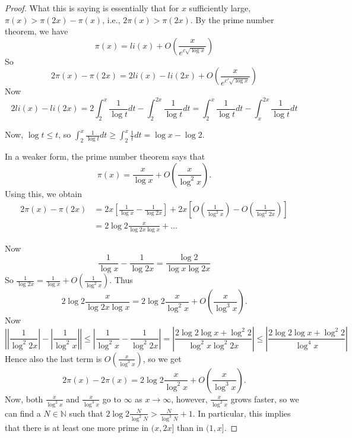\documentclass[reqno]{amsart}
\theoremstyle{definition}
\theoremstyle{remark}
\begin{document}
\begin{proof}
    What this is saying is essentially that
    for $x$ sufficiently large,
    $\pi(x) > \pi(2x) - \pi(x)$, i.e.,
    $2 \pi(x) > \pi(2x)$. By the prime number theorem, we
    have
    \[
    \pi(x) = li(x) + O\left( \frac{x}{e^{c \sqrt{\log x} }} \right) 
    \] 
    So
    \[
    2\pi(x) - \pi(2x)
    = 2 li(x) - li(2x)
    + O \left( \frac{x}{e^{c' \sqrt{\log x} }} \right) 
    \] 
    Now
    \[
    2 li(x) - li(2x)
    = 2 \int_{2}^{x} \frac{1}{\log t}dt
    - \int_{2}^{2x} \frac{1}{\log t}dt
    = \int_{2}^{x} \frac{1}{\log t}dt
    - \int_{x}^{2x} \frac{1}{\log t} dt 
    \] 

    Now,
    $\log t \le t$, so
    $\int_{2}^{x} \frac{1}{\log t} dt
    \ge \int_{2}^{x} \frac{1}{t}dt
    = \log x - \log 2$.

    In a weaker form, the prime number theorem says that
    \[
    \pi(x) = \frac{x}{\log x} + O\left( \frac{x}{\log^2 x} \right) .
    \] 
    Using this, we obtain
    \begin{align*}
    2 \pi(x) - \pi(2x)
    &= 2x \left[ \frac{1}{\log x} - \frac{1}{\log 2x} \right] 
    + 2x\left[ O \left( \frac{1}{\log^2 x} \right) 
    - O \left( \frac{1}{\log^2 2x} \right)  \right]\\
    &= 2 \log 2 \frac{x}{\log 2x \log x} + \ldots
    \end{align*}

    Now
    \[
    \frac{1}{\log x} - \frac{1}{\log 2x}
    = \frac{\log 2}{\log x \log 2x}
    \] 
    So
    $\frac{1}{\log 2x} = \frac{1}{\log x} + 
    O \left( \frac{1}{\log^2 x} \right) $.
    Thus
    \[
    2 \log 2 \frac{x}{\log 2x \log x}
    = 2 \log 2 \frac{x}{\log^2 x}
    + O \left( \frac{x}{\log^3 x} \right) .
    \] 
    Now
    \[
    \left| \left| \frac{1}{\log^2 2x} \right| -
    \left| \frac{1}{\log^2 x} \right| \right| 
    \le \left| \frac{1}{\log^2 x}- \frac{1}{\log^2 2x} \right| 
    =
    \left| \frac{2 \log 2 \log x + \log^2 2}{\log^2 x \log^2 2x}
    \right| 
    \le \left| \frac{2 \log 2 \log x + \log^2 2}{
    \log^{4} x} \right| 
    \] 
    Hence
    also the last term is
    $O \left( \frac{x}{\log^3 x} \right) $, so
    we get
    \[
    2 \pi(x) - 2 \pi(x) = 
    2 \log 2 \frac{x}{\log^2 x} + 
    O \left( \frac{x}{\log^3 x} \right) .
    \] 
    Now, both
    $\frac{x}{\log^2 x}$ and
    $\frac{x}{\log^3 x}$ go to
    $\infty$ as $x \to \infty$, however,
    $\frac{x}{\log^2 x}$ grows faster, so
    we can find a $N \in \mathbb{N} $ such that
    $2 \log 2 \frac{N}{\log^2 N}
    > \frac{N}{\log^3 N} + 1$. In particular,
    this implies that
    there is at least one more
    prime in
    $(x,2x]$ than in $(1,x]$.
\end{proof}
\end{document}
